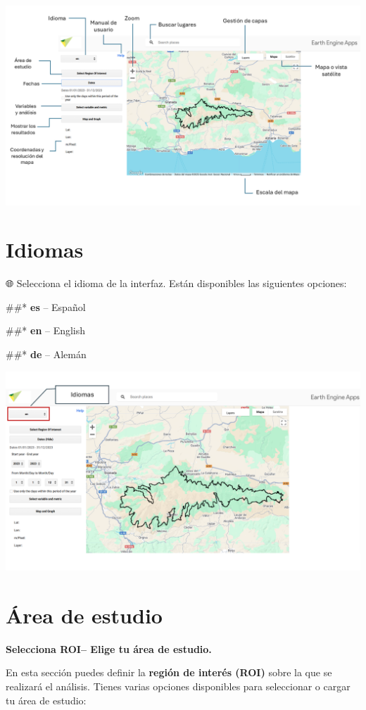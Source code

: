 \documentclass[
]{book}
\begin{document}
\includegraphics{assets/InterfazMonitorEO_es.png}

\chapter{Idiomas}\label{idiomas}

🌐 Selecciona el idioma de la interfaz. Están disponibles las siguientes opciones:

\#\#* \textbf{es} -- Español

\#\#* \textbf{en} -- English

\#\#* \textbf{de} -- Alemán

\includegraphics{assets/Idiomas.png}

\chapter{Área de estudio}\label{area-estudio}

\textbf{Selecciona ROI-- Elige tu área de estudio.}

En esta sección puedes definir la \textbf{región de interés (ROI)} sobre la que se realizará el análisis. Tienes varias opciones disponibles para seleccionar o cargar tu área de estudio:
\end{document}
